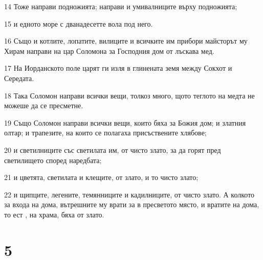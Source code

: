 \par 14 Тоже направи подножията; направи и умивалниците върху подножията;
\par 15 и едното море с дванадесетте вола под него.
\par 16 Също и котлите, лопатите, вилиците и всичките им прибори майсторът му Хирам направи на цар Соломона за Господния дом от лъскава мед.
\par 17 На Иорданското поле царят ги изля в глинената земя между Сокхот и Середата.
\par 18 Така Соломон направи всички вещи, толкоз много, щото теглото на медта не можеше да се пресметне.
\par 19 Също Соломон направи всички вещи, които бяха за Божия дом; и златния олтар; и трапезите, на които се полагаха присъствените хлябове;
\par 20 и светилниците със светилата им, от чисто злато, за да горят пред светилището според наредбата;
\par 21 и цветята, светилата и клещите, от злато, и то чисто злато;
\par 22 и щипците, легените, темянниците и кадилниците, от чисто злато. А колкото за входа на дома, вътрешните му врати за в пресветото място, и вратите на дома, то ест , на храма, бяха от злато.

\chapter{5}

